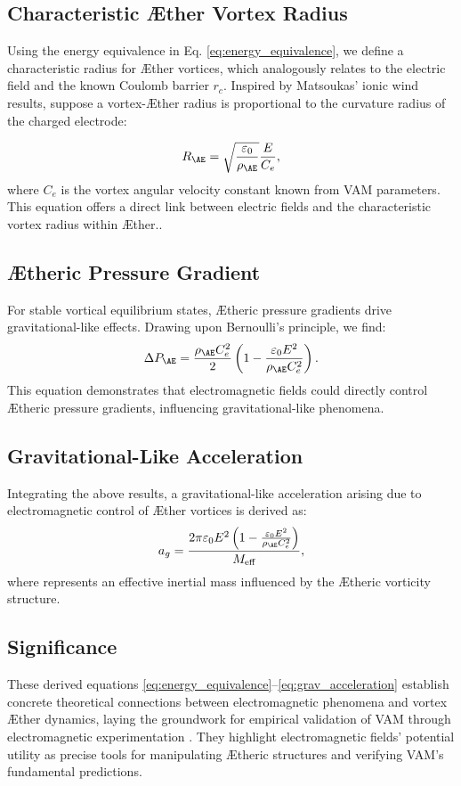 \subsection{Characteristic Æther Vortex Radius}
Using the energy equivalence in Eq. \eqref{eq:energy_equivalence}, we define a characteristic radius  for Æther vortices, which analogously
relates to the electric field and the known Coulomb barrier $r_c$.  Inspired by Matsoukas' ionic wind results, suppose a vortex-Æther radius is
proportional to the curvature radius of the charged electrode:

\begin{equation}\label{eq:vortex_radius}
R_{\AE} = \sqrt{\frac{\varepsilon_0}{\rho_{\AE}}}\frac{E}{C_e},
\end{equation}
where $C_e$ is the vortex angular velocity constant known from VAM parameters.
This equation offers a direct link between electric fields and the characteristic vortex radius within Æther.\cite{RelationsBetweenConstants2005}.
\subsection{Ætheric Pressure Gradient}
For stable vortical equilibrium states, Ætheric pressure gradients drive gravitational-like effects. Drawing upon Bernoulli’s principle, we find:
\begin{equation}\label{eq:pressure_gradient}
\Delta P_{\AE} = \frac{\rho_{\AE} C_e^2}{2}\left(1 - \frac{\varepsilon_0 E^2}{\rho_{\AE} C_e^2}\right).
\end{equation}
This equation demonstrates that electromagnetic fields could directly control Ætheric pressure gradients, influencing gravitational-like phenomena.
\subsection{Gravitational-Like Acceleration}
Integrating the above results, a gravitational-like acceleration  arising due to electromagnetic control of Æther vortices is derived as:
\begin{equation}\label{eq:grav_acceleration}
a_{g} = \frac{2\pi \varepsilon_0 E^2\left(1 - \frac{\varepsilon_0 E^2}{\rho_{\AE}C_e^2}\right)}{M_{\text{eff}}},
\end{equation}
where  represents an effective inertial mass influenced by the Ætheric vorticity structure.
\subsection{Significance}
These derived equations \eqref{eq:energy_equivalence}--\eqref{eq:grav_acceleration} establish concrete theoretical connections between electromagnetic phenomena and vortex Æther dynamics, laying the groundwork for empirical validation of VAM through electromagnetic experimentation \cite{Podkletnov2007, Kleckner2013}. They highlight electromagnetic fields' potential utility as precise tools for manipulating Ætheric structures and verifying VAM's fundamental predictions.
